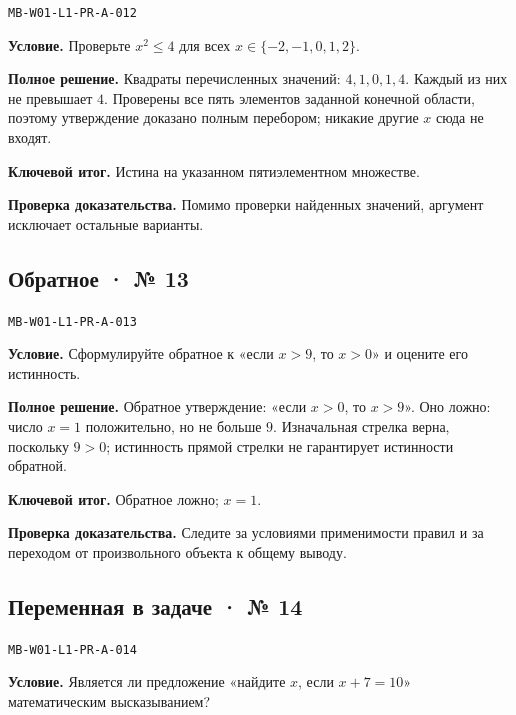 \documentclass[11pt,a4paper,openany]{book}
\newcommand{\muid}[1]{\texttt{\footnotesize #1}}
\begin{document}
\muid{MB-W01-L1-PR-A-012}\par

\textbf{Условие.} Проверьте $x^2\le4$ для всех $x\in\{-2,-1,0,1,2\}$.\par

\textbf{Полное решение.} Квадраты перечисленных значений: $4,1,0,1,4$. Каждый из них не превышает $4$. Проверены все пять элементов заданной конечной области, поэтому утверждение доказано полным перебором; никакие другие $x$ сюда не входят.


\begin{learnbox}\textbf{Ключевой итог.} Истина на указанном пятиэлементном множестве.\par \textbf{Проверка доказательства.} 
Помимо проверки найденных значений, аргумент исключает остальные варианты. 
\end{learnbox}

\subsection*{Обратное · № 13}\hypertarget{solution:MB-W01-L1-PR-A-013}{}

\muid{MB-W01-L1-PR-A-013}\par

\textbf{Условие.} Сформулируйте обратное к «если $x>9$, то $x>0$» и оцените его истинность.\par

\textbf{Полное решение.} Обратное утверждение: «если $x>0$, то $x>9$». Оно ложно: число $x=1$ положительно, но не больше $9$. Изначальная стрелка верна, поскольку $9>0$; истинность прямой стрелки не гарантирует истинности обратной.


\begin{learnbox}\textbf{Ключевой итог.} Обратное ложно; $x=1$.\par \textbf{Проверка доказательства.} 
Следите за условиями применимости правил и за переходом от произвольного объекта к общему выводу. 
\end{learnbox}

\subsection*{Переменная в задаче · № 14}\hypertarget{solution:MB-W01-L1-PR-A-014}{}

\muid{MB-W01-L1-PR-A-014}\par

\textbf{Условие.} Является ли предложение «найдите $x$, если $x+7=10$» математическим высказыванием?\par
\end{document}
